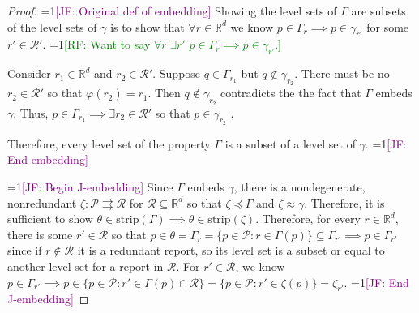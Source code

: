 \documentclass[12pt]{article}
\newcommand{\Comments}{1}
\newcommand{\mynote}[2]{\ifnum\Comments=1\textcolor{#1}{#2}\fi}
\newcommand{\raf}[1]{\mynote{green}{[RF: #1]}}
\newcommand{\jessie}[1]{\mynote{purple}{[JF: #1]}}
\newcommand{\reals}{\mathbb{R}}
\renewcommand{\P}{\mathcal{P}}
\newcommand{\R}{\mathcal{R}}
\newcommand{\toto}{\rightrightarrows}
\newcommand{\strip}{\mathrm{strip}}
\begin{document}
\begin{proof}
	\jessie{Original def of embedding}
	Showing the level sets of $\Gamma$ are subsets of the level sets of $\gamma$ is to show that $\forall r \in \reals^d$ we know $p \in \Gamma_r \implies p \in \gamma_{r'}$ for some $r' \in \R'$.
    \raf{Want to say $\forall r$ $\exists r'$ $p \in \Gamma_r \implies p \in \gamma_{r'}$.}
    
	Consider $r_1 \in \reals^d$ and $r_2 \in \R'$.
	Suppose $q \in \Gamma_{r_1}$ but $q \not \in \gamma_{r_2}$.
	There must be no $r_2 \in \R'$ so that $\varphi(r_2) = r_1$.
	Then $q \not \in \gamma_{r_2}$ contradicts the the fact that $\Gamma$ embeds $\gamma$.
	Thus, $p \in \Gamma_{r_1} \implies \exists r_2 \in \R'$ so that $p \in \gamma_{r_2}$ .
	
	Therefore, every level set of the property $\Gamma$ is a subset of a level set of $\gamma$.
	\jessie{End embedding}
	
	\jessie{Begin J-embedding}
	Since $\Gamma$ embeds $\gamma$, there is a nondegenerate, nonredundant $\zeta: \P \toto \R$ for $\R \subseteq \reals^d$ so that $\zeta \preceq \Gamma$ and $\zeta \approx \gamma$.
	Therefore, it is sufficient to show $\theta \in \strip(\Gamma) \implies \theta \in \strip(\zeta)$.
	Therefore, for every $r \in \reals^d$, there is some $r' \in \R$ so that $ p \in \theta = \Gamma_r = \{ p \in \P : r \in \Gamma(p) \} \subseteq \Gamma_{r'} \implies p \in \Gamma_{r'}$ since if $r \not \in \R$ it is a redundant report, so its level set is a subset or equal to another level set for a report in $\R$.
	For $r' \in \R$, we know $p \in \Gamma_{r'} \implies p \in \{ p \in \P : r' \in \Gamma(p) \cap \R \} = \{ p \in \P : r' \in \zeta(p) \} = \zeta_{r'}$. %
	\jessie{End J-embedding}
\end{proof}
\end{document}
